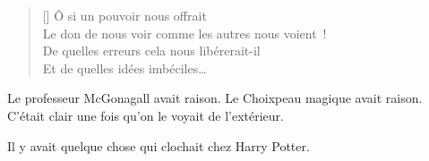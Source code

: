 \baselineskip\settowidth{\versewidth}{Le don de nous voir comme les autres nous voient~!} \begin{verse}[\versewidth] Ô si un pouvoir nous offrait\\ Le don de nous voir comme les autres nous voient~!\\ De quelles erreurs cela nous libérerait-il\\ Et de quelles idées imbéciles… \end{verse}

Le professeur McGonagall avait raison. Le Choixpeau magique avait raison. C'était clair une fois qu'on le voyait de l'extérieur.

Il y avait quelque chose qui clochait chez Harry Potter.~

